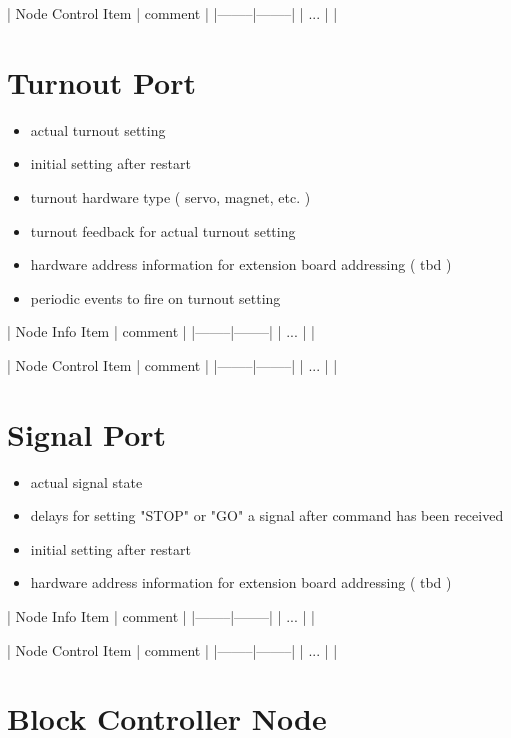 | Node Control Item | comment |
|--------|--------|
| ... | |


\section{Turnout Port}

\begin{itemize}
\begin{itemize}
\item actual turnout setting
\item initial setting after restart
\item turnout hardware type ( servo, magnet, etc. )
\item turnout feedback for actual turnout setting
\item hardware address information for extension board addressing ( tbd )
\item periodic events to fire on turnout setting
\end{itemize}
\end{itemize}

| Node Info Item | comment |
|--------|--------|
| ... | |

| Node Control Item | comment |
|--------|--------|
| ... | |

\section{Signal Port}

\begin{itemize}
\begin{itemize}
\item actual signal state
\item delays for setting "STOP" or "GO" a signal after command has been received
\item initial setting after restart
\item hardware address information for extension board addressing ( tbd )
\end{itemize}
\end{itemize}

| Node Info Item | comment |
|--------|--------|
| ... | |

| Node Control Item | comment |
|--------|--------|
| ... | |


\section{Block Controller Node}

